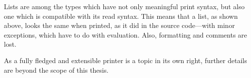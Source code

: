 \documentclass[a4paper,10pt,twoside]{article}
\newcommand{\el}{Emacs Lisp}
\newcommand{\cl}{Common Lisp}
\newcommand{\elr}{el-reader}
\newcommand{\emacs}{GNU~Emacs}
\begin{document}
Lists are among the types which have not only meaningful print syntax, but also
one which is compatible with its read syntax.  This means that a list, as shown
above, looks the same when printed, as it did in the source code---with minor
exceptions, which have to do with evaluation.  Also, formatting and comments are
lost.

As a fully fledged and extensible printer is a topic in its own right, further
details are beyond the scope of this thesis.




\begin{comment}
  The reason why lisp code has so many parentheses, is that parentheses denote a
  list in Lisp.  Expressions in general, save the most trivial ones, are
  represented of lists containing other lists and symbols.\footnote{Plus of
    course other entities such as numbers, yet these are not relevant to this
    discussion.}
\end{comment}


\end{document}
